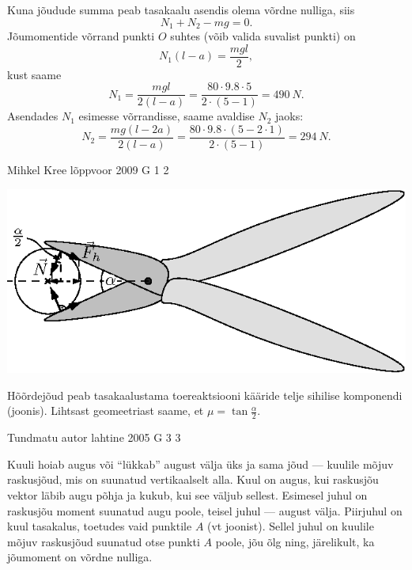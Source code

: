 \documentclass[11pt, twoside]{article}
\begin{document}
{{Kuna jõudude summa peab tasakaalu asendis olema võrdne nulliga, siis
\[
N_1 + N_2 - mg = 0.
\]
Jõumomentide võrrand punkti $O$ suhtes (võib valida suvalist punkti) on
\[
N_{1}(l-a)=\frac{m g l}{2},
\]
kust saame
\[
N_{1}=\frac{m g l}{2(l-a)}=\frac{80 \cdot \num{9,8} \cdot 5}{2 \cdot(5-1)}=\SI{490}{N}.
\]
Asendades $N_1$ esimesse võrrandisse, saame avaldise $N_2$ jaoks:
\[
N_{2}=\frac{m g(l-2 a)}{2(l-a)}=\frac{80 \cdot \num{9,8} \cdot(5-2 \cdot 1)}{2 \cdot(5-1)}=\SI{294}{N}.
\]
\fi
}

{Mihkel Kree} %
{lõppvoor} %
{2009} %
{G 1} %
{2} %
{

\ifSolution
\begin{center}
	\includegraphics[width=0.9\linewidth]{2009-v3g-01-G_nyrinenud_kaarid_lah.eps}
\end{center}

Hõõrdejõud peab tasakaalustama toereaktsiooni kääride telje sihilise komponendi (joonis). Lihtsast geomeetriast saame, et $\mu = \tan \frac{\alpha}{2}$.
\fi
}

{Tundmatu autor} %
{lahtine} %
{2005} %
{G 3} %
{3} %
{

\ifSolution
Kuuli hoiab augus või \enquote{lükkab} august välja üks ja sama jõud --- kuulile mõjuv raskusjõud, mis on suunatud vertikaalselt alla. Kuul on augus, kui raskusjõu vektor läbib augu põhja ja kukub, kui see väljub sellest. Esimesel juhul on raskusjõu moment suunatud augu poole, teisel juhul --- august välja. Piirjuhul on kuul tasakalus, toetudes vaid punktile $A$ (vt joonist). Sellel juhul on kuulile mõjuv raskusjõud suunatud otse punkti $A$ poole, jõu õlg ning, järelikult, ka jõumoment on võrdne nulliga.

}}
\end{document}
